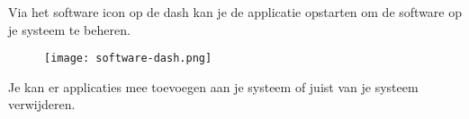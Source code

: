 Via het software icon op de dash kan je de applicatie opstarten om de software op je systeem te beheren.
\begin{figure}[H]
\texttt{[image: software-dash.png]}
\end{figure}
Je kan er applicaties mee toevoegen aan je systeem of juist van je systeem verwijderen.

